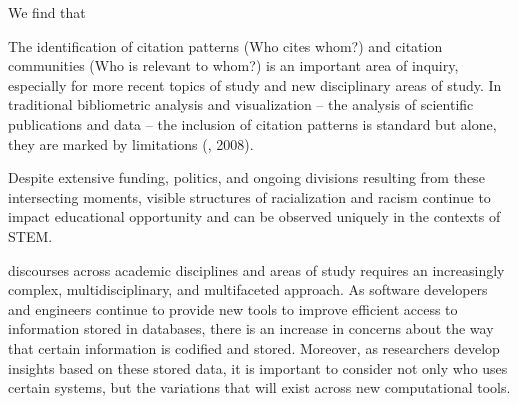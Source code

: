 We find that


\newpage

The identification of citation patterns (Who cites whom?) and citation communities (Who is relevant to whom?) is an important area of inquiry, especially for more recent topics of study and new disciplinary areas of study. In traditional bibliometric analysis and visualization -- the analysis of scientific publications and data -- the inclusion of citation patterns is standard but alone, they are marked by limitations (\cite{gingras2008effects}, 2008). 

Despite extensive funding, politics, and ongoing divisions resulting from these intersecting moments, visible structures of racialization and racism continue to impact educational opportunity and can be observed uniquely in the contexts of STEM. 

discourses across academic disciplines and areas of study requires an increasingly complex, multidisciplinary, and multifaceted approach. As software developers and engineers continue to provide new tools to improve efficient access to information stored in databases, there is an increase in concerns about the way that certain information is codified and stored. Moreover, as researchers develop insights based on these stored data, it is important to consider not only who uses certain systems, but the variations that will exist across new computational tools. 


